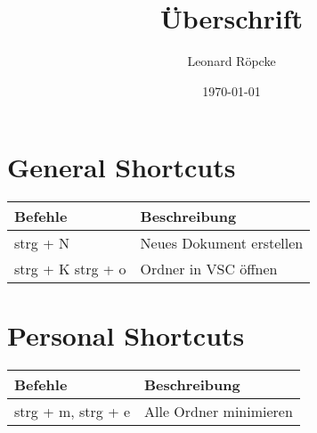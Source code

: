 \documentclass[12pt,a4paper]{article}
\title{Überschrift}
\author{Leonard Röpcke}
\date{\today}
\begin{document}
\maketitle

\begin{center}
    
    \section*{General Shortcuts}
    \begin{tabular}{|p{6cm}||p{6cm}|}
        \hline
        Befehle & Beschreibung \\
        \hline
        strg + N & Neues Dokument erstellen \\
        \hline
        strg + K strg + o & Ordner in VSC öffnen \\
        \hline
    \end{tabular}
    
    
    \section*{Personal Shortcuts}
    \begin{tabular}{|p{6cm}||p{6cm}|}
        \hline
        Befehle & Beschreibung \\
        \hline
        strg + m, strg + e & Alle Ordner minimieren \\
        \hline
    \end{tabular}
    
\end{center}
    
\end{document}
